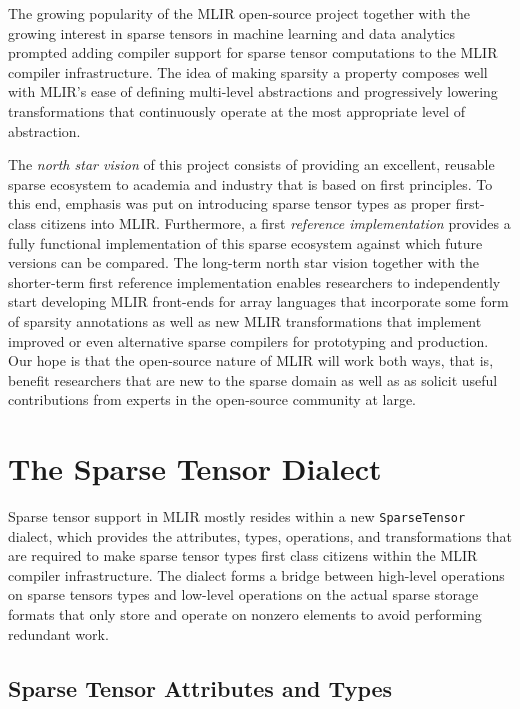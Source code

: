 \documentclass[10pt]{article}
\begin{document}
The growing popularity of the MLIR open-source project together with the growing interest in sparse tensors in machine learning and data analytics prompted adding compiler support for sparse tensor computations to the MLIR compiler infrastructure. The idea of making sparsity a property composes well with MLIR's ease of defining multi-level abstractions and progressively lowering transformations that continuously operate at the most appropriate level of abstraction.

The \emph{north star vision} of this project consists of providing an excellent, reusable sparse ecosystem to academia and industry that is based on first principles. To this end, emphasis was put on introducing sparse tensor types as proper first-class citizens into MLIR. Furthermore, a first \emph{reference implementation} provides a fully functional implementation of this sparse ecosystem against which future versions can be compared. The long-term north star vision together with the shorter-term first reference implementation enables researchers to independently start developing MLIR front-ends for array languages that incorporate some form of sparsity annotations as well as new MLIR transformations that implement improved or even alternative sparse compilers for prototyping and production. Our hope is that the open-source nature of MLIR will work both ways, that is, benefit researchers that are new to the sparse domain as well as as solicit useful contributions from experts in the open-source community at large.  

\section{The Sparse Tensor Dialect}
\label{sparse_dialect}

Sparse tensor support in MLIR mostly resides within a new \texttt{SparseTensor} dialect, which provides the attributes, types, operations, and transformations that are required to make sparse tensor types first class citizens within the MLIR compiler infrastructure. The dialect forms a bridge between high-level operations on sparse tensors types and low-level operations on the actual sparse storage formats that only store and operate on nonzero elements to avoid performing redundant work.

\subsection{Sparse Tensor Attributes and Types}
\end{document}
